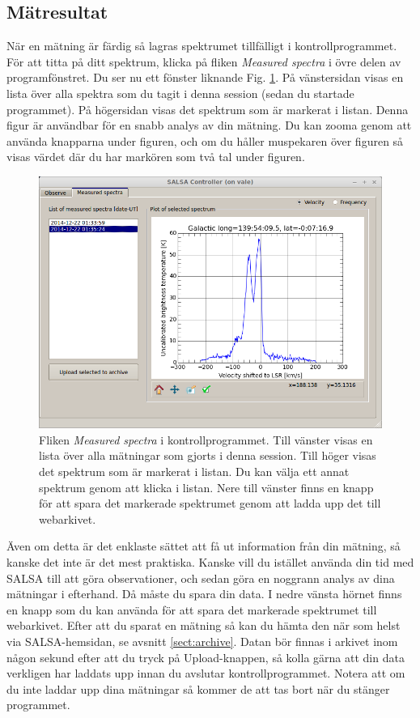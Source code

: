 \subsection{Mätresultat}
\label{sect:inspect}
När en mätning är färdig så lagras spektrumet tillfälligt i kontrollprogrammet. 
För att titta på ditt spektrum, klicka på fliken \emph{Measured spectra} i 
övre delen av programfönstret. Du ser nu ett fönster liknande Fig.  
\ref{fig:controlspectra}. På vänstersidan visas en lista över alla spektra som du
tagit i denna session (sedan du startade programmet). På högersidan visas det spektrum
som är markerat i listan. Denna figur är användbar för en snabb analys av din mätning. 
Du kan zooma genom att använda knapparna under figuren, och om du håller muspekaren
över figuren så visas värdet där du har markören som två tal under figuren. 
\begin{figure}[ht]
\begin{center}
\includegraphics[width=\textwidth]{../figures/Controller_spectra.png}
\end{center}
\caption{Fliken \emph{Measured spectra} i kontrollprogrammet. Till vänster
	visas en lista över alla mätningar som gjorts i denna session. Till höger 
	visas det spektrum som är markerat i listan. Du kan välja ett annat spektrum
	genom att klicka i listan. Nere till vänster finns en knapp för att spara
	det markerade spektrumet genom att ladda upp det till webarkivet. 
}
\label{fig:controlspectra}
\end{figure}
Även om detta är det enklaste sättet att få ut information från din mätning,
så kanske det inte är det mest praktiska. Kanske vill du istället använda din tid
med SALSA till att göra observationer, och sedan göra en noggrann analys av dina
mätningar i efterhand. Då måste du spara din data. I nedre vänsta hörnet finns en 
knapp som du kan använda för att spara det markerade spektrumet till webarkivet.
Efter att du sparat en mätning så kan du hämta den när som helst via SALSA-hemsidan,
se avsnitt \ref{sect:archive}. Datan bör finnas i arkivet inom någon sekund
efter att du tryck på Upload-knappen, så kolla gärna att din data verkligen 
har laddats upp innan du avslutar kontrollprogrammet. Notera att om du inte 
laddar upp dina mätningar så kommer de att tas bort när du stänger programmet.

